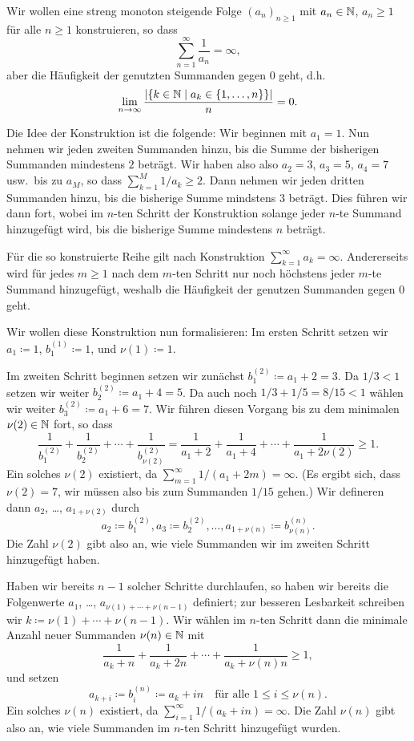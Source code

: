 \documentclass[a4paper,10pt]{article}
\begin{document}
Wir wollen eine streng monoton steigende Folge $(a_n)_{n \geq 1}$ mit $a_n \in \mathbb{N}$, $a_n \geq 1$ für alle $n \geq 1$ konstruieren, so dass
\[
 \sum_{n=1}^\infty \frac{1}{a_n} = \infty,
\]
aber die Häufigkeit der genutzten Summanden gegen $0$ geht, d.h.
\begin{equation}\label{eqn: Grenzwert}
 \lim_{n \to \infty} \frac{|\{k \in \mathbb{N} \mid a_k \in \{1, \dotsc, n\}\}|}{n} = 0.
\end{equation}

Die Idee der Konstruktion ist die folgende: Wir beginnen mit $a_1 = 1$. Nun nehmen wir jeden zweiten Summanden hinzu, bis die Summe der bisherigen Summanden mindestens $2$ beträgt. Wir haben also also $a_2 = 3$, $a_3 = 5$, $a_4 = 7$ usw.\ bis zu $a_M$, so dass $\sum_{k=1}^M 1/a_k \geq 2$. Dann nehmen wir jeden dritten Summanden hinzu, bis die bisherige Summe mindstens $3$ beträgt. Dies führen wir dann fort, wobei im $n$-ten Schritt der Konstruktion solange jeder $n$-te Summand hinzugefügt wird, bis die bisherige Summe mindestens $n$ beträgt.

Für die so konstruierte Reihe gilt nach Konstruktion $\sum_{k=1}^\infty a_k = \infty$. Andererseits wird für jedes $m \geq 1$ nach dem $m$-ten Schritt nur noch höchstens jeder $m$-te Summand hinzugefügt, weshalb die  Häufigkeit der genutzen Summanden gegen $0$ geht.

Wir wollen diese Konstruktion nun formalisieren: Im ersten Schritt setzen wir $a_1 \coloneqq 1$, $b^{(1)}_1 \coloneqq 1$, und $\nu(1) \coloneqq 1$.

Im zweiten Schritt beginnen setzen wir zunächst $b^{(2)}_1 \coloneqq a_1 + 2 = 3$. Da $1/3 < 1$ setzen wir weiter $b^{(2)}_2 \coloneqq a_1 + 4 = 5$. Da auch noch $1/3 + 1/5 = 8/15 < 1$ wählen wir weiter $b^{(2)}_3 \coloneqq a_1 + 6 = 7$. Wir führen diesen Vorgang bis zu dem minimalen $\nu(2) \in \mathbb{N}$ fort, so dass
\[
 \frac{1}{b^{(2)}_1} + \frac{1}{b^{(2)}_2} + \dotsb + \frac{1}{b^{(2)}_{\nu(2)}}
 = \frac{1}{a_1 + 2} + \frac{1}{a_1 + 4} + \dotsb +  \frac{1}{a_1 + 2 \nu(2)}
 \geq 1.
\]
Ein solches $\nu(2)$ existiert, da $\sum_{m=1}^\infty 1/(a_1 + 2m) = \infty$. (Es ergibt sich, dass $\nu(2) = 7$, wir müssen also bis zum Summanden $1/15$ gehen.) Wir defineren dann $a_2$, \dots, $a_{1+\nu(2)}$ durch
\[
 a_2 \coloneqq b^{(2)}_1, a_3 \coloneqq b^{(2)}_2, \dotsc, a_{1+\nu(n)} \coloneqq b^{(n)}_{\nu(n)}.
\]
Die Zahl $\nu(2)$ gibt also an, wie viele Summanden wir im zweiten Schritt hinzugefügt haben.

Haben wir bereits $n-1$ solcher Schritte durchlaufen, so haben wir bereits die Folgenwerte $a_1$, \dots, $a_{\nu(1)+\dotsb+\nu(n-1)}$ definiert; zur besseren Lesbarkeit schreiben wir \mbox{$k \coloneqq \nu(1)+\dotsb+\nu(n-1)$}. Wir wählen im $n$-ten Schritt dann die minimale Anzahl neuer Summanden \mbox{$\nu(n) \in \mathbb{N}$} mit
\[
 \frac{1}{a_k + n} + \frac{1}{a_k + 2n} + \dotsb + \frac{1}{a_k + \nu(n)n} \geq 1,
\]
und setzen
\[
 a_{k + i} \coloneqq b^{(n)}_i \coloneqq a_k + in \quad \text{für alle $1 \leq i \leq \nu(n)$}.
\]
Ein solches $\nu(n)$ existiert, da $\sum_{i=1}^\infty 1/(a_k + in) = \infty$.  Die Zahl $\nu(n)$ gibt also an, wie viele Summanden im $n$-ten Schritt hinzugefügt wurden.
\end{document}
